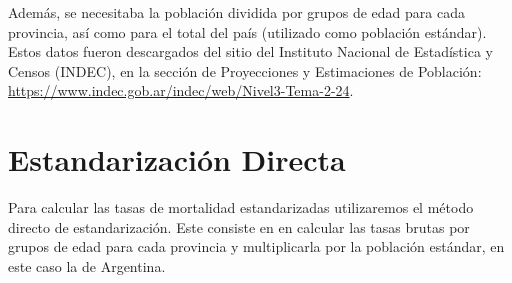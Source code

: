 \documentclass[
]{article}
\begin{document}
Además, se necesitaba la población dividida por grupos de edad para cada
provincia, así como para el total del país (utilizado como población
estándar). Estos datos fueron descargados del sitio del Instituto
Nacional de Estadística y Censos (INDEC), en la sección de Proyecciones
y Estimaciones de Población:
\url{https://www.indec.gob.ar/indec/web/Nivel3-Tema-2-24}.

\section{Estandarización Directa}\label{estandarizaciuxf3n-directa}

Para calcular las tasas de mortalidad estandarizadas utilizaremos el
método directo de estandarización. Este consiste en en calcular las
tasas brutas por grupos de edad para cada provincia y multiplicarla por
la población estándar, en este caso la de Argentina.
\end{document}
